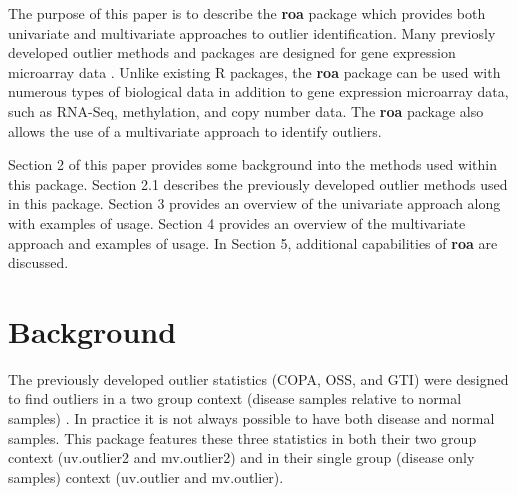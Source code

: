 \documentclass[11pt, a4paper]{article}
\begin{document}
The purpose of this paper is to describe the \textbf{roa} package which provides both univariate and multivariate approaches to outlier identification. Many previosly developed outlier methods and packages are designed for gene expression microarray data \cite{gti,oss,copa,multi,zodet}. Unlike existing R packages, the \textbf{roa} package can be used with numerous types of biological data in addition to gene expression microarray data, such as RNA-Seq, methylation, and copy number data. The \textbf{roa} package also allows the use of a multivariate approach to identify outliers.

Section 2 of this paper provides some background into the methods used within this package. Section 2.1 describes the previously developed outlier methods used in this package. Section 3 provides an overview of the univariate approach along with examples of usage. Section 4 provides an overview of the multivariate approach and examples of usage. In Section 5, additional capabilities of \textbf{roa} are discussed.

\section{Background}
The previously developed outlier statistics (COPA, OSS, and GTI) were designed to find outliers in a two group context (disease samples relative to normal samples) \cite{gti,oss,copa}. In practice it is not always possible to have both disease and normal samples. This package features these three statistics in both their two group context (uv.outlier2 and mv.outlier2) and in their single group (disease only samples) context (uv.outlier and mv.outlier).
\end{document}

